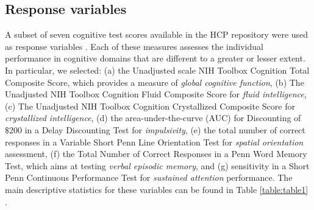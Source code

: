 \documentclass[10pt,letterpaper]{article}
\begin{document}
\subsection*{Response variables}
A subset of seven cognitive test scores available in the HCP repository were used as response variables \cite{BARCH2013169}. Each of these measures assesses the individual performance in cognitive domains that are different to a greater or lesser extent. In particular, we selected: (a) the Unadjusted scale NIH Toolbox Cognition Total Composite Score, which provides a measure of {\it global cognitive function}, (b)  The Unadjusted NIH Toolbox Cognition Fluid Composite Score for {\it fluid intelligence},  (c) The Unadjusted NIH Toolbox Cognition Crystallized Composite Score for {\it crystallized intelligence},
(d) the area-under-the-curve (AUC) for Discounting of $\$200$ in a Delay Discounting Test for {\it impulsivity}, (e) the total number of correct responses in a Variable Short Penn Line Orientation Test for {\it spatial orientation} assessment, (f) the Total Number of Correct Responses in a Penn Word Memory Test, which aims at testing {\it verbal episodic memory}, and (g) sensitivity in a Short Penn Continuous Performance Test for {\it sustained attention} performance. The main descriptive statistics for these variables can be found in Table \ref{table:table1} .
\end{document}
